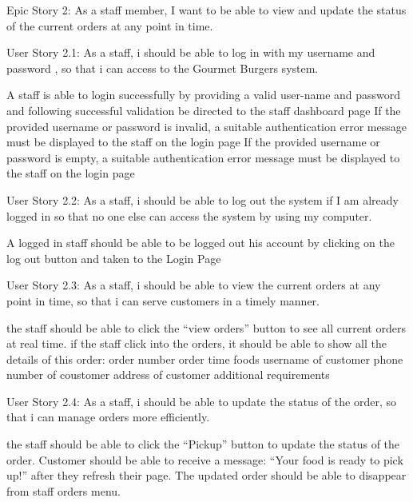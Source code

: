 Epic Story 2:
As a staff member, I want to be able to view and update the status of the current orders at any point in time.

User Story 2.1:
As a staff, i should be able to log in with my username and password , so that i can access to the Gourmet Burgers system.

A staff is able to login successfully by providing a valid user-name and password and following successful validation be directed to the staff dashboard page
If the provided username or password is invalid, a suitable authentication error message must be displayed to the staff on the login page
If the provided username or password is empty, a suitable authentication error message must be displayed to the staff on the login page

User Story 2.2:
As a staff, i should be able to log out the system if I am already logged in so that no one else can access the system by using my computer.

A logged in staff should be able to be logged out his account by clicking on the log out button and taken to the Login Page

User Story 2.3:
As a staff, i should be able to view the current orders at any point in time, so that i can serve customers in a timely manner.

the staff should be able to click the “view orders” button to see all current orders at real time.
if the staff click into the orders, it should be able to show all the details of this order:
order number
order time
foods
username of customer
phone number of coustomer
address of customer
additional requirements 

User Story 2.4:
As a staff, i should be able to update the status of the order, so that i can manage orders more efficiently.

the staff should be able to click the “Pickup” button to update the status of the order.
Customer should be able to receive a message: “Your food is ready to pick up!” after they refresh their page.
The updated order should be able to disappear from staff orders menu.
